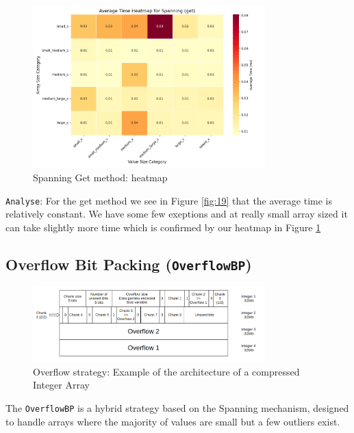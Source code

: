 \documentclass[11pt, a4paper]{article}
\begin{document}
	\begin{figure}[H]%
		\centering
		\includegraphics[width=0.8\textwidth]{Grafics/Spanning/SpanningGetHeat.png}
		\caption{Spanning Get method: heatmap}
		\label{fig:20}
	\end{figure}
	\texttt{Analyse}: For the get method we see in Figure \ref{fig:19} that the average time is relatively constant. We have some few exeptions and at really small array sized it can take slightly more time which is confirmed by our heatmap in Figure \ref{fig:20}
	
	\subsection{Overflow Bit Packing (\texttt{OverflowBP})}
	\label{sec:overflow_bp}
	
	\begin{figure}[h]
		\centering
		\includegraphics[width=0.8\textwidth]{Grafics/overflow.png}
		\caption{Overflow strategy: Example of the architecture of a compressed Integer Array}
		\label{fig:overflow_arch}
	\end{figure}
	
	The \texttt{OverflowBP} is a hybrid strategy based on the Spanning mechanism, designed to handle arrays where the majority of values are small but a few outliers exist.
	
\end{document}

